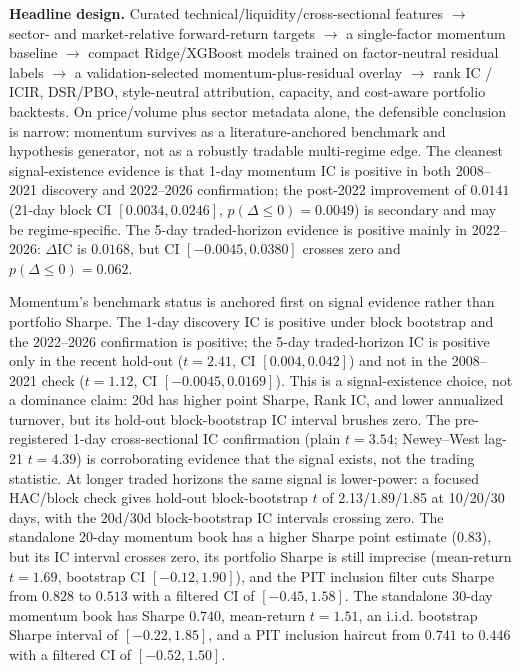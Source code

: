 \documentclass[9pt]{extarticle}
\begin{document}
\textbf{Headline design.} Curated technical/liquidity/cross-sectional features
$\rightarrow$ sector- and market-relative forward-return targets $\rightarrow$ a
single-factor momentum baseline $\rightarrow$ compact Ridge/XGBoost models
trained on factor-neutral residual labels $\rightarrow$ a validation-selected
momentum-plus-residual overlay $\rightarrow$ rank IC / ICIR, DSR/PBO,
style-neutral attribution, capacity, and cost-aware portfolio backtests. On
price/volume plus sector metadata alone, the defensible conclusion is narrow:
momentum survives as a literature-anchored benchmark and hypothesis generator,
not as a robustly tradable multi-regime edge. The cleanest signal-existence
evidence is that 1-day momentum IC is positive in both 2008--2021 discovery and
2022--2026 confirmation; the post-2022 improvement of $0.0141$ (21-day block CI
$[0.0034,0.0246]$, $p(\Delta\le0)=0.0049$) is secondary and may be
regime-specific. The 5-day traded-horizon evidence is positive mainly in
2022--2026: $\Delta$IC is $0.0168$, but CI $[-0.0045,0.0380]$ crosses zero and
$p(\Delta\le0)=0.062$.

Momentum's benchmark status is anchored first on signal evidence rather than
portfolio Sharpe. The 1-day discovery IC is positive under block bootstrap and
the 2022--2026 confirmation is positive; the 5-day traded-horizon IC is
positive only in the recent hold-out ($t=2.41$, CI $[0.004,0.042]$) and not in
the 2008--2021 check ($t=1.12$, CI $[-0.0045,0.0169]$). This is a
signal-existence choice, not a dominance claim: 20d has higher point Sharpe,
Rank IC, and lower annualized turnover, but its hold-out
block-bootstrap IC interval brushes zero. The pre-registered 1-day
cross-sectional IC confirmation (plain $t=3.54$; Newey--West lag-21 $t=4.39$)
is corroborating evidence that the signal exists, not the trading statistic.
At longer traded horizons the same signal is lower-power: a focused HAC/block
check gives hold-out block-bootstrap $t$ of 2.13/1.89/1.85 at 10/20/30 days,
with the 20d/30d block-bootstrap IC intervals crossing zero. The standalone 20-day
momentum book has a higher Sharpe point estimate ($0.83$), but its IC interval
crosses zero, its portfolio Sharpe is still imprecise (mean-return $t=1.69$,
bootstrap CI $[-0.12,1.90]$), and the PIT inclusion filter cuts Sharpe from
$0.828$ to $0.513$ with a filtered CI of $[-0.45,1.58]$. The standalone 30-day momentum book has Sharpe $0.740$,
mean-return $t=1.51$, an i.i.d. bootstrap Sharpe interval of $[-0.22,1.85]$,
and a PIT inclusion haircut from $0.741$ to $0.446$ with a filtered CI of
$[-0.52,1.50]$.
\end{document}
